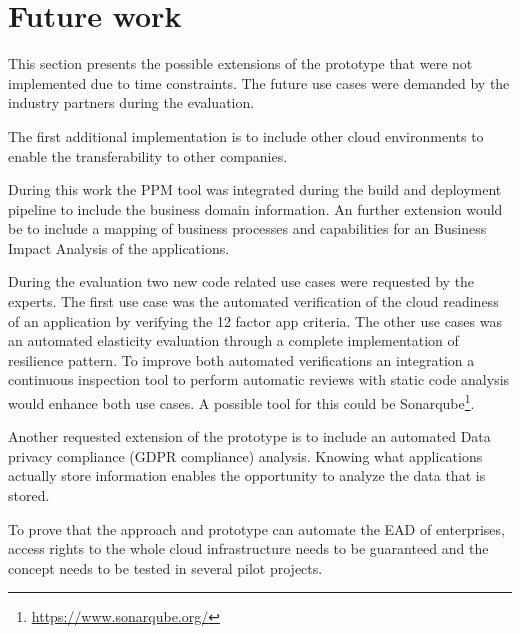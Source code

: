 \section{Future work}

This section presents the possible extensions of the prototype that were not implemented due to time constraints. The future use cases were demanded by the industry partners during the evaluation.

The first additional implementation is to include other cloud environments to enable the transferability to other companies.

During this work the PPM tool was integrated during the build and deployment pipeline to include the business domain information. An further extension would be to include a mapping of business processes and capabilities for an Business Impact Analysis of the applications.

During the evaluation two new code related use cases were requested by the experts. The first use case was the automated verification of the cloud readiness of an application by verifying the 12 factor app criteria. The other use cases was an automated elasticity evaluation through a complete implementation of resilience pattern. To improve both automated verifications an integration a continuous inspection tool to perform automatic reviews with static code analysis would enhance both use cases. A possible tool for this could be Sonarqube\footnote{\url{https://www.sonarqube.org/}}. 

Another requested extension of the prototype is to include an automated Data privacy compliance (GDPR compliance) analysis. Knowing what applications actually store information enables the opportunity to analyze the data that is stored.

To prove that the approach and prototype can automate the EAD of enterprises, access rights to the whole cloud infrastructure needs to be guaranteed and the concept needs to be tested in several pilot projects.


